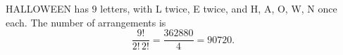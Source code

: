 HALLOWEEN has $9$ letters, with L twice, E twice, and H, A, O, W, N once each. The number of arrangements is
\[\dfrac{9!}{2!\,2!}=\dfrac{362880}{4}=\boxed{90720}.\]
